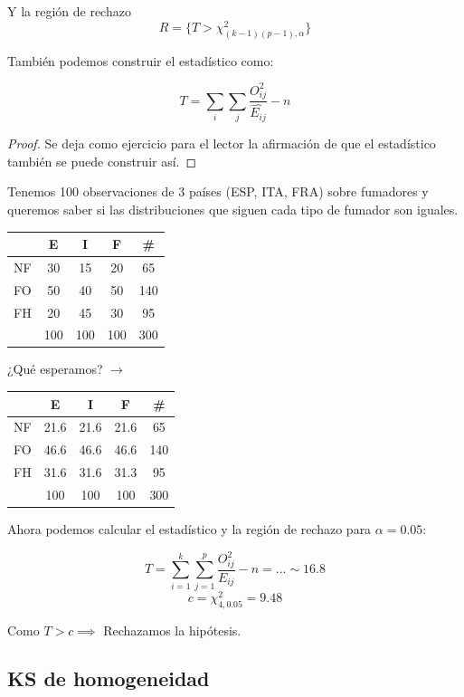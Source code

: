 \begin{enumerate}
Y la región de rechazo \[R = \{T>\chi^2_{(k-1)(p-1),α}\}\]

\obs También podemos construir el estadístico como:

\[
T = \sum_{i}\sum_j \frac{O_{ij}^2}{\hat{E_{ij}}} - n
\]

\begin{proof}
Se deja como ejercicio para el lector la afirmación de que el estadístico también se puede construir así.
\end{proof}
\end{enumerate}


\begin{example}

Tenemos 100 observaciones de 3 países (ESP, ITA, FRA) sobre fumadores y queremos saber si las distribuciones que siguen cada tipo de fumador son iguales.

\begin{center}


\begin{tabular}{c|ccc|c}
 & E & I & F & \#\\\hline
NF&30&15&20&65\\
FO&50&40&50&140\\
FH&20&45&30&95\\\hline
&100 & 100 & 100 & 300
\end{tabular}
¿Qué esperamos? $\to$
\begin{tabular}{c|ccc|c}
 & E & I & F & \#\\\hline
NF & 21.6 & 21.6 & 21.6 & 65 \\
FO & 46.6 & 46.6 & 46.6 & 140 \\
FH & 31.6 & 31.6 & 31.3 & 95 \\
\hline
&100 & 100 & 100 & 300
\end{tabular}
\end{center}

Ahora podemos calcular el estadístico y la región de rechazo para $α=0.05$:

\[ T = \sum_{i=1}^k \sum_{j=1}^p \frac{O_{ij}^2}{E_{ij}} -n = ... \sim 16.8\]
\[ c = \chi^2_{4,0.05} = 9.48\]

Como $T > c \implies $ Rechazamos la hipótesis.

\end{example}

\subsection{KS de homogeneidad}

